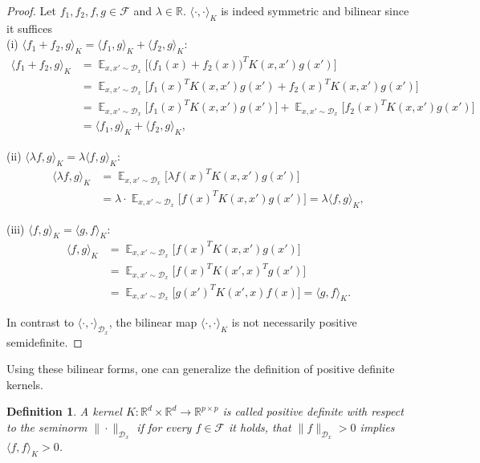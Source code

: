 \documentclass[11pt, a4paper]{article}
\newtheorem{definition}[theorem]{Definition}
\newcommand{\R}{\mathds{R}}
\newcommand{\D}{\mathcal{D}}
\newcommand{\F}{\mathcal{F}}
\DeclareMathOperator*{\E}{\mathds{E}}
\begin{document}
\begin{proof}
Let $f_1, f_2, f, g \in \F$ and $\lambda \in \R$. $\langle \cdot,\cdot \rangle_{K}$ is indeed symmetric and bilinear since it suffices \\

(i) $\langle f_1 + f_2 , g \rangle_{K} = \langle f_1 , g \rangle_{K} + \langle f_2 , g \rangle_{K}$:
\[ \begin{split}
\langle f_1 + f_2 , g \rangle_{K}
&= \E_{x,x' \sim \D_x} \Big [ \big ( f_1(x) + f_2(x) \big )^TK(x,x')g(x') \Big ] \\\
&= \E_{x,x' \sim \D_x} \Big [ f_1(x)^TK(x,x')g(x') + f_2(x)^TK(x,x')g(x') \Big ] \\\
&= \E_{x,x' \sim \D_x} \Big [ f_1(x)^TK(x,x')g(x') \Big ] + \E_{x,x' \sim \D_x} \Big [ f_2(x)^TK(x,x')g(x') \Big ] \\\
&= \langle f_1 , g \rangle_{K} + \langle f_2 , g \rangle_{K},
\end{split} \]

(ii) $\langle \lambda f , g \rangle_{K} = \lambda \langle f, g \rangle_{K}$:
\[ \begin{split} 
\langle \lambda f , g \rangle_{K} 
&= \E_{x,x' \sim \D_x} \Big [ \lambda f(x)^TK(x,x')g(x') \Big ] \\\
&= \lambda \cdot \E_{x,x' \sim \D_x} \Big [ f(x)^TK(x,x')g(x') \Big ] = \lambda \langle f, g \rangle_{K}, 
\end{split} \]

(iii) $\langle f , g \rangle_{K} = \langle g , f \rangle_{K}$:
\[ \begin{split} \langle f , g \rangle_{K} 
&= \E_{x,x' \sim \D_x} \Big [ f(x)^TK(x,x')g(x') \Big ] \\\
&= \E_{x,x' \sim \D_x} \Big [ f(x)^TK(x',x)^Tg(x') \Big ] \\\
&= \E_{x,x' \sim \D_x} \Big [ g(x')^TK(x',x)f(x) \Big ] = \langle g , f \rangle_{K}.
\end{split} \]

In contrast to $\langle \cdot , \cdot \rangle_{\D_x}$, the bilinear map $\langle \cdot , \cdot \rangle_{K}$ is not necessarily positive semidefinite.
\end{proof}

Using these bilinear forms, one can generalize the definition of positive definite kernels.

\begin{definition}
A kernel $K: \R^d \times \R^d \to \R^{p \times p}$ is called positive definite with respect to the seminorm $\| \cdot \| _{\D_x}$ if for every $f \in \F$ it holds, that $\| f \|_{\D_x} > 0$ implies $\langle f, f \rangle_K > 0$.
\end{definition}
\end{document}
